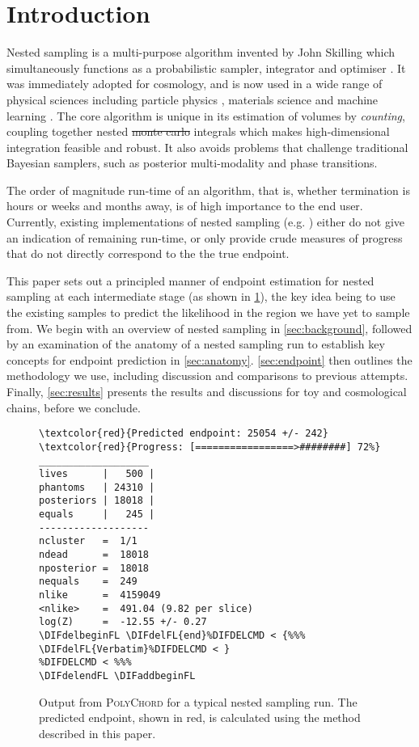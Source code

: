 \documentclass[usenatbib]{mnras}
\providecommand{\DIFaddtex}[1]{{\protect\color{blue}\uwave{#1}}} %
\providecommand{\DIFdeltex}[1]{{\protect\color{red}\sout{#1}}}                      %
\providecommand{\DIFaddbegin}{} %
\providecommand{\DIFaddend}{} %
\providecommand{\DIFdelbegin}{} %
\providecommand{\DIFdelend}{} %
\providecommand{\DIFdelFL}[1]{\DIFdel{#1}} %
\providecommand{\DIFaddbeginFL}{} %
\providecommand{\DIFaddendFL}{} %
\providecommand{\DIFdelbeginFL}{} %
\providecommand{\DIFdelendFL}{} %
\providecommand{\DIFadd}[1]{\texorpdfstring{\DIFaddtex{#1}}{#1}} %
\providecommand{\DIFdel}[1]{\texorpdfstring{\DIFdeltex{#1}}{}} %
\newcommand{\DIFscaledelfig}{0.5}
\newlength{\DIFdelgraphicswidth} %
\newlength{\DIFdelgraphicsheight} %
\newcommand{\DIFaddincludegraphics}[2][]{{\color{blue}\fbox{\DIFOincludegraphics[#1]{#2}}}} %
\newcommand{\DIFdelincludegraphics}[2][]{%
\sbox{\DIFdelgraphicsbox}{\DIFOincludegraphics[#1]{#2}}%
\settoboxwidth{\DIFdelgraphicswidth}{\DIFdelgraphicsbox} %
\settoboxtotalheight{\DIFdelgraphicsheight}{\DIFdelgraphicsbox} %
\scalebox{\DIFscaledelfig}{%
\parbox[b]{\DIFdelgraphicswidth}{\usebox{\DIFdelgraphicsbox}\\[-\baselineskip] \rule{\DIFdelgraphicswidth}{0em}}\llap{\resizebox{\DIFdelgraphicswidth}{\DIFdelgraphicsheight}{%
\setlength{\unitlength}{\DIFdelgraphicswidth}%
\begin{picture}(1,1)%
\thicklines\linethickness{2pt} %
{\color[rgb]{1,0,0}\put(0,0){\framebox(1,1){}}}%
{\color[rgb]{1,0,0}\put(0,0){\line( 1,1){1}}}%
{\color[rgb]{1,0,0}\put(0,1){\line(1,-1){1}}}%
\end{picture}%
}\hspace*{3pt}}} %
} %
\DeclareRobustCommand{\DIFaddbegin}{\DIFOaddbegin \let\includegraphics\DIFaddincludegraphics} %
\DeclareRobustCommand{\DIFaddend}{\DIFOaddend \let\includegraphics\DIFOincludegraphics} %
\DeclareRobustCommand{\DIFdelbegin}{\DIFOdelbegin \let\includegraphics\DIFdelincludegraphics} %
\DeclareRobustCommand{\DIFdelend}{\DIFOaddend \let\includegraphics\DIFOincludegraphics} %
\DeclareRobustCommand{\DIFaddbeginFL}{\DIFOaddbeginFL \let\includegraphics\DIFaddincludegraphics} %
\DeclareRobustCommand{\DIFaddendFL}{\DIFOaddendFL \let\includegraphics\DIFOincludegraphics} %
\DeclareRobustCommand{\DIFdelbeginFL}{\DIFOdelbeginFL \let\includegraphics\DIFdelincludegraphics} %
\DeclareRobustCommand{\DIFdelendFL}{\DIFOaddendFL \let\includegraphics\DIFOincludegraphics} %
\begin{document}
\section{Introduction}
Nested sampling is a multi-purpose algorithm invented by John Skilling which simultaneously functions as a probabilistic sampler, integrator and optimiser \citep{skilling}. It was immediately adopted for cosmology, and is now used in a wide range of physical sciences including particle physics \citep{Trotta_2008}, materials science \citep{materials} and machine learning \citep{sparse_reconstruction}. The core algorithm is unique in its estimation of volumes by \textit{counting}, coupling together nested \DIFdelbegin \DIFdel{monte carlo }\DIFdelend \DIFaddbegin \DIFadd{Monte Carlo }\DIFaddend integrals which makes high-dimensional integration feasible and robust. It also avoids problems that challenge traditional Bayesian samplers, such as posterior multi-modality and phase transitions.
\par
The order of magnitude run-time of an algorithm, that is, whether termination is hours or weeks and months away, is of high importance to the end user. Currently, existing implementations of nested sampling (e.g. \citealt{multinest, polychord, dnest, dynesty, ultranest, nessai,proxnest}) either do not give an indication of remaining run-time, or only provide crude measures of progress that do not directly correspond to the the true endpoint.
\par
This paper sets out a principled manner of endpoint estimation for nested sampling at each intermediate stage (as shown in \cref{fig:polychord_output}), the key idea being to use the existing samples to predict the likelihood in the region we have yet to sample from. We begin with an overview of nested sampling in \cref{sec:background}, followed by an examination of the anatomy of a nested sampling run to establish key concepts for endpoint prediction in \cref{sec:anatomy}. \cref{sec:endpoint} then outlines the methodology we use, including discussion and comparisons to previous attempts. Finally, \cref{sec:results} presents the results and discussions for toy and cosmological chains, before we conclude.
\begin{figure}
\begin{Verbatim}[frame=single, commandchars=\\\{\}]
\textcolor{red}{Predicted endpoint: 25054 +/- 242}
\textcolor{red}{Progress: [=================>########] 72%}
___________________
lives      |   500 |
phantoms   | 24310 |
posteriors | 18018 |
equals     |   245 |
-------------------
ncluster   =  1/1
ndead      =  18018
nposterior =  18018
nequals    =  249
nlike      =  4159049
<nlike>    =  491.04 (9.82 per slice)
log(Z)     =  -12.55 +/- 0.27
\DIFdelbeginFL \DIFdelFL{end}%DIFDELCMD < {%%%
\DIFdelFL{Verbatim}%DIFDELCMD < }
%DIFDELCMD < %%%
\DIFdelendFL \DIFaddbeginFL \end{Verbatim}
\DIFaddendFL \caption{Output from \textsc{PolyChord} for a typical nested sampling run. The predicted endpoint, shown in red, is calculated using the method described in this paper.}
\label{fig:polychord_output}
\end{figure}
\end{document}
